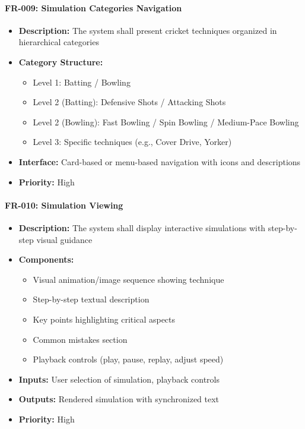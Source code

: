\documentclass[12pt,a4paper]{article}
\begin{document}
\begin{enumerate}
\paragraph{FR-009: Simulation Categories Navigation}
\begin{itemize}
    \item \textbf{Description:} The system shall present cricket techniques organized in hierarchical categories
    \item \textbf{Category Structure:}
    \begin{itemize}
        \item Level 1: Batting / Bowling
        \item Level 2 (Batting): Defensive Shots / Attacking Shots
        \item Level 2 (Bowling): Fast Bowling / Spin Bowling / Medium-Pace Bowling
        \item Level 3: Specific techniques (e.g., Cover Drive, Yorker)
    \end{itemize}
    \item \textbf{Interface:} Card-based or menu-based navigation with icons and descriptions
    \item \textbf{Priority:} High
\end{itemize}

\paragraph{FR-010: Simulation Viewing}
\begin{itemize}
    \item \textbf{Description:} The system shall display interactive simulations with step-by-step visual guidance
    \item \textbf{Components:}
    \begin{itemize}
        \item Visual animation/image sequence showing technique
        \item Step-by-step textual description
        \item Key points highlighting critical aspects
        \item Common mistakes section
        \item Playback controls (play, pause, replay, adjust speed)
    \end{itemize}
    \item \textbf{Inputs:} User selection of simulation, playback controls
    \item \textbf{Outputs:} Rendered simulation with synchronized text
    \item \textbf{Priority:} High
\end{itemize}


\end{enumerate}
\end{document}
